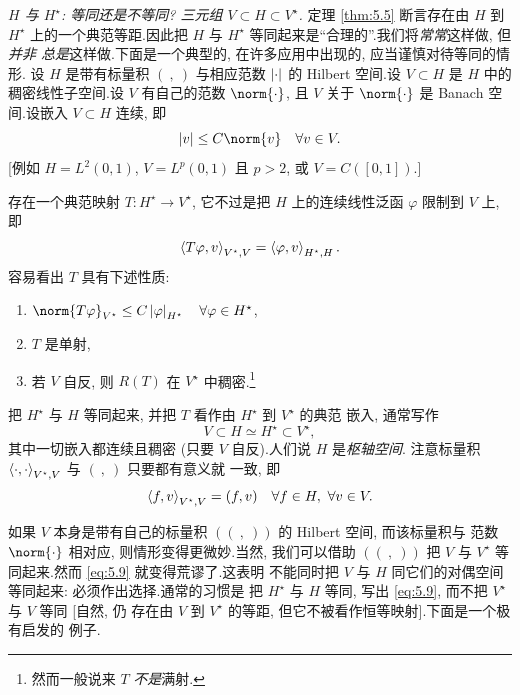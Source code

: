 \begin{keyremark}
\label{rem:5.3}
\emph{$H$ 与 $H^\star$: 等同还是不等同? 三元组 $V\subset H\subset V^\star$.}
定理  \ref{thm:5.5} 断言存在由 $H$ 到 $H^\star$ 上的一个典范等距.因此把
$H$ 与 $H^\star$ 等同起来是``合理的''.我们将\emph{常常}这样做, 但\emph{并非
总是}这样做.下面是一个典型的, 在许多应用中出现的, 应当谨慎对待等同的情形.
设 $H$ 是带有标量积 $(\ ,\ )$ 与相应范数 $\left|\cdot\right|$ 的 Hilbert 空间.设
$V\subset H$ 是 $H$ 中的稠密线性子空间.设 $V$ 有自己的范数 $\norm{\cdot}$,
且 $V$ 关于 $\norm{\cdot}$ 是 Banach 空间.设嵌入 $V\subset H$ 连续, 即
\begin{equation*}
\abs{v}\le C\norm{v}\quad\forall v\in V.
\end{equation*}
[例如 $H=L^2(0,1)$, $V=L^p(0,1)$ 且 $p>2$, 或 $V=C([0,1])$.]

存在一个典范映射 $T:H^\star\to V^\star$, 它不过是把 $H$ 上的连续线性泛函
$\varphi$ 限制到 $V$ 上, 即
\begin{equation*}
\left\langle T\varphi,v\right\rangle_{V^\star,V}=\left\langle \varphi,v\right\rangle_{H^\star,H}.
\end{equation*}
容易看出 $T$ 具有下述性质:
\begin{enumerate}[label=(\roman*), leftmargin=2.6em, itemsep=0.1em]
	\item $\norm{T\varphi}_{V^\star}\le C\abs{\varphi}_{H^\star}
	      \quad\forall\varphi\in H^\star$,
	\item $T$ 是单射,
	\item 若 $V$ 自反, 则 $R(T)$ 在 $V^\star$ 中稠密.\footnote{然而一般说来
	      $T$ \emph{不是}满射.}
\end{enumerate}

把 $H^\star$ 与 $H$ 等同起来, 并把 $T$ 看作由 $H^\star$ 到 $V^\star$ 的典范
嵌入, 通常写作
\begin{equation}
\boxed{V\subset H\simeq H^\star\subset V^\star,}
\label{eq:5.9}
\end{equation}
其中一切嵌入都连续且稠密 (只要 $V$ 自反).人们说 $H$ 是\emph{枢轴空间}.
注意标量积 $\left\langle \cdot,\cdot\right\rangle_{V^\star,V}$ 与 $(\ ,\ )$ 只要都有意义就
一致, 即
\begin{equation*}
\left\langle f,v\right\rangle_{V^\star,V}=(f,v)\quad\forall f\in H,\ \forall v\in V.
\end{equation*}
\end{keyremark}

如果 $V$ 本身是带有自己的标量积 $((\ ,\ ))$ 的 Hilbert 空间, 而该标量积与
范数 $\norm{\cdot}$ 相对应, 则情形变得更微妙.当然, 我们可以借助
$((\ ,\ ))$ 把 $V$ 与 $V^\star$ 等同起来.然而 \eqref{eq:5.9} 就变得荒谬了.这表明
不能同时把 $V$ 与 $H$ 同它们的对偶空间等同起来: 必须作出选择.通常的习惯是
把 $H^\star$ 与 $H$ 等同, 写出 \eqref{eq:5.9}, 而不把 $V^\star$ 与 $V$ 等同 [自然, 仍
存在由 $V$ 到 $V^\star$ 的等距, 但它不被看作恒等映射].下面是一个极有启发的
例子.

